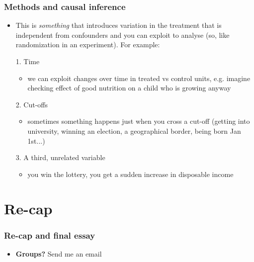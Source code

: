 \documentclass[aspectratio=43]{beamer}
\begin{document}
\begin{frame}
\frametitle{Methods and causal inference}
\centering

\begin{itemize}
  \item This is \textit{something} that introduces variation in the treatment that is independent from confounders and you can exploit to analyse (so, like randomization in an experiment). For example:
  \item[1.] Time
  \begin{itemize}
    \item we can exploit changes over time in treated vs control units, e.g. imagine checking effect of good nutrition on a child who is growing anyway
  \end{itemize}
  \item[2.] Cut-offs
  \begin{itemize}
    \item sometimes something happens just when you cross a cut-off (getting into university, winning an election, a geographical border, being born Jan 1st...)
  \end{itemize}
  \item[3.] A third, unrelated variable
  \begin{itemize}
    \item you win the lottery, you get a sudden increase in disposable income
  \end{itemize}
\end{itemize}

\end{frame}


\section{Re-cap}

\begin{frame}
\frametitle{Re-cap and final essay}
\centering

\begin{itemize}
  \item \textbf{Groups?} Send me an email
\end{itemize}

\end{frame}

\end{document}

